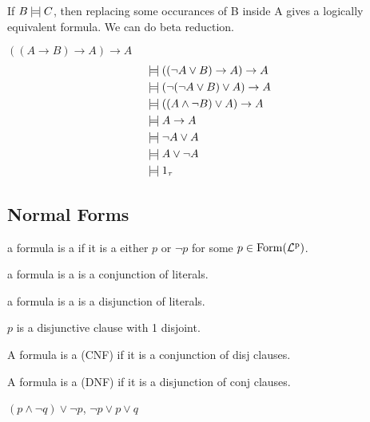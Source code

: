 \documentclass[12pt]{article}
\begin{document}
\bboxthm
\begin{thm}[Replaceabiliy]
  If \(B\mathbin{\mid\!=\!\mid} C\), then replacing some occurances of B inside A
  gives a logically equivalent formula. We can do beta reduction.
\end{thm}
\ebox

\bboxexam
\begin{exam}
  \(((A\rightarrow B)\rightarrow A)\rightarrow A\)
  \begin{align*}
    &\logeq((\neg A\vee B)\to A)\to A\\
    &\logeq(\neg(\neg A\vee B)\vee A)\to A\\
    &\logeq((A\wedge\neg B)\vee A)\to A\\
    &\logeq A\to A\\
    &\logeq\neg A\vee A\\
    &\logeq A\vee\neg A\\
    &\logeq 1_\tau
  \end{align*}
\end{exam}
\ebox

\subsection{Normal Forms}

\bboxdefn
\begin{defn}[Literals]
  a formula is a  if it is a either \(p\) or \(\neg p\) for some \(p\in\mathrm{Form}(\mathrm{\mathcal{L}^p_{}})\). 
\end{defn}
\ebox

\bboxdefn
\begin{defn}
  a formula is a  is a conjunction of literals.
\end{defn}
\ebox

\bboxdefn
\begin{defn}
  a formula is a  is a disjunction of literals.
  \bboxexam
  \begin{exam}
    \(p\) is a disjunctive clause with 1 disjoint.
  \end{exam}
  \ebox
\end{defn}
\ebox

\bboxdefn
\begin{defn}
  A formula is a (CNF) if it is a conjunction of disj clauses.
\end{defn}
\ebox

\bboxdefn
\begin{defn}
  A formula is a (DNF) if it is a disjunction of conj clauses.
  \bboxexam
  \begin{exam}
    \((p\wedge\neg q)\vee\neg p\), 
    \(\neg p\vee p\vee q\)
  \end{exam}
  \ebox

\end{defn}
\ebox
\end{document}
